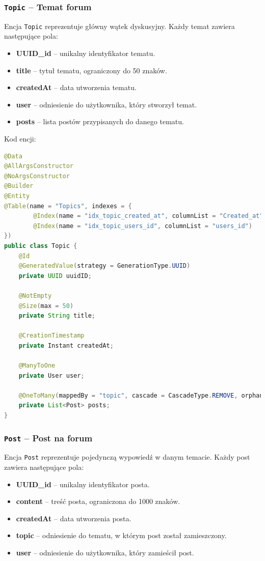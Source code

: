 \subsubsection{\texttt{Topic} -- Temat forum}
Encja \texttt{Topic} reprezentuje główny wątek dyskusyjny. Każdy temat zawiera następujące pola:
\begin{itemize}
    \item \textbf{UUID\_id} -- unikalny identyfikator tematu.
    \item \textbf{title} -- tytuł tematu, ograniczony do 50 znaków.
    \item \textbf{createdAt} -- data utworzenia tematu.
    \item \textbf{user} -- odniesienie do użytkownika, który stworzył temat.
    \item \textbf{posts} -- lista postów przypisanych do danego tematu.
\end{itemize}

Kod encji:
\begin{lstlisting}[language=Java, style=JavaStyle, caption=Encja \texttt{Topic}]
@Data
@AllArgsConstructor
@NoArgsConstructor
@Builder
@Entity
@Table(name = "Topics", indexes = {
        @Index(name = "idx_topic_created_at", columnList = "Created_at"),
        @Index(name = "idx_topic_users_id", columnList = "users_id")
})
public class Topic {
    @Id
    @GeneratedValue(strategy = GenerationType.UUID)
    private UUID uuidID;

    @NotEmpty
    @Size(max = 50)
    private String title;

    @CreationTimestamp
    private Instant createdAt;

    @ManyToOne
    private User user;

    @OneToMany(mappedBy = "topic", cascade = CascadeType.REMOVE, orphanRemoval = true)
    private List<Post> posts;
}
\end{lstlisting}

\subsubsection{\texttt{Post} -- Post na forum}
Encja \texttt{Post} reprezentuje pojedynczą wypowiedź w danym temacie. Każdy post zawiera następujące pola:
\begin{itemize}
    \item \textbf{UUID\_id} -- unikalny identyfikator posta.
    \item \textbf{content} -- treść posta, ograniczona do 1000 znaków.
    \item \textbf{createdAt} -- data utworzenia posta.
    \item \textbf{topic} -- odniesienie do tematu, w którym post został zamieszczony.
    \item \textbf{user} -- odniesienie do użytkownika, który zamieścił post.
\end{itemize}

